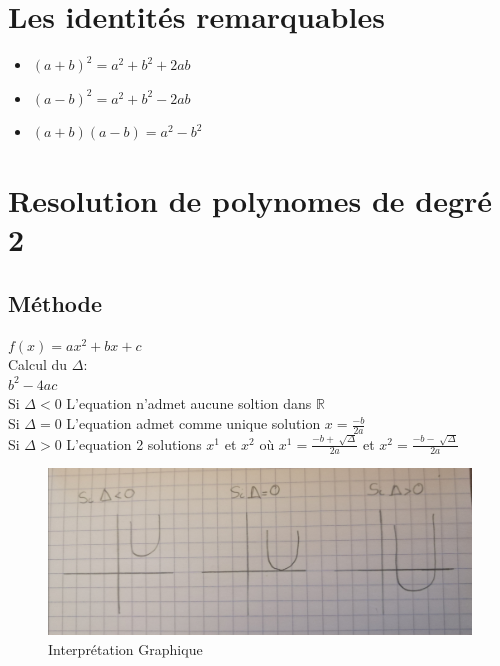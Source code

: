 \documentclass[10pt,a4paper]{article}
\newcommand{\reels}{\mathbb{R}}
\begin{document}


\section{Les identités remarquables}
\begin{itemize}
 \item $(a+b)^2= a^2+b^2+ 2ab$
 \item $(a-b)^2 =a^2+b^2-2ab$
 \item $(a+b)(a-b) = a^2-b^2$
\end{itemize}
\section{Resolution de polynomes de degré 2}
\subsection{Méthode}
$f(x)=ax^2+bx+c$\\
Calcul du $\Delta $:\\
$b^2-4ac$\\
Si $\Delta <0$ L'equation n'admet aucune soltion dans $\reels$\\
Si $\Delta =0$ L'equation admet comme unique solution $x=\frac{-b}{2a}$\\
Si $\Delta >0$ L'equation 2 solutions $x^1$ et $x^2$ où $x^1= \frac{-b+\sqrt[]{\Delta}}{2a}$ et $x^2= \frac{-b-\sqrt[]{\Delta}}{2a}$ 
\begin{figure}[h!]
\centering
\includegraphics[scale=0.150]{image/poly.jpg}
\caption{Interprétation Graphique}
\label{fig:net}
\end{figure}
\newpage
\end{document}
